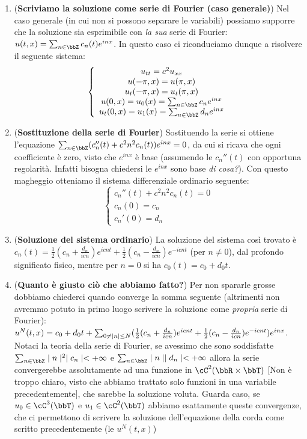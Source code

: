 \documentclass[a4paper,NoNotes,GeneralMath]{stdmdoc}
\newcommand{\CT}[1]{\cC^{#1}(\bbT)}
\begin{document}
\begin{enumerate}
        \item ({\bf Scriviamo la soluzione come serie di Fourier (caso generale)}) Nel caso generale (in cui non si possono separare le variabili) possiamo supporre che la soluzione sia esprimibile con {\it la sua} serie di Fourier: $u(t, x) = \sum_{n \in \bbZ} c_n(t) e^{inx} $. In questo caso ci riconduciamo dunque a risolvere il seguente sistema:
          $$\left\{ \begin{array}{c} u_{tt} = c^2 u_{xx} \\ u(-\pi, x) = u(\pi, x) \\ u_t(-\pi, x) = u_t(\pi, x) \\ u(0, x) = u_0(x) = \sum_{n \in \bbZ} c_n e^{inx} \\ u_t(0, x) = u_1(x) = \sum_{n \in \bbZ} d_n e^{inx} \\ \end{array} \right.$$
        \item ({\bf Sostituzione della serie di Fourier}) Sostituendo la serie si ottiene l'equazione $\sum_{n \in \bbZ} (c_n''(t) + c^2 n^2 c_n(t)) e^{inx} = 0$, da cui si ricava che ogni coefficiente è zero, visto che $e^{inx}$ è base (assumendo le $c_n''(t)$ con opportuna regolarità. Infatti bisogna chiedersi le $e^{inx}$ sono base {\it di cosa?}). Con questo magheggio otteniamo il sistema differenziale ordinario seguente:
          $$ \left\{ \begin{array}{c} c_n''(t) + c^2 n^2 c_n(t) = 0 \\ c_n(0) = c_n \\ c_n'(0) = d_n \end{array} \right. $$
        \item ({\bf Soluzione del sistema ordinario}) La soluzione del sistema così trovato è $c_n(t) = \frac{1}{2} (c_n + \frac{d_n}{icn}) e^{icnt} + \frac{1}{2} (c_n - \frac{d_n}{icn}) e^{-icnt}$ (per $n \neq 0$), dal profondo significato fisico, mentre per $n = 0$ si ha $c_0(t) = c_0 + d_0 t$.
        \item ({\bf Quanto è giusto ciò che abbiamo fatto?}) Per non spararle grosse dobbiamo chiederci quando converge la somma seguente (altrimenti non avremmo potuto in primo luogo scrivere la soluzione come {\it propria} serie di Fourier): $u^N(t, x) = c_0 + d_0 t + \sum_{0 \neq \mid n \mid \le N} (\frac{1}{2} (c_n + \frac{d_n}{icn}) e^{icnt} + \frac{1}{2} (c_n - \frac{d_n}{icn}) e^{-icnt}) e^{inx}$. Notaci la teoria della serie di Fourier, se avessimo che sono soddisfatte $\sum_{n \in \bbZ} \abs{n}^2 \abs{c_n} < +\infty$ e $\sum_{n \in \bbZ} \abs{n} \abs{d_n} < +\infty$ allora la serie convergerebbe assolutamente ad una funzione in $\cC^2(\bbR \times \bbT)$ [Non è troppo chiaro, visto che abbiamo trattato solo funzioni in una variabile precedentemente], che sarebbe la soluzione voluta. Guarda caso, se $u_0 \in \CT{3}$ e $u_1 \in \CT{2}$ abbiamo esattamente queste convergenze, che ci permettono di scrivere la soluzione dell'equazione della corda come scritto precedentemente (le $u^N(t, x)$)

\end{enumerate}
\end{document}
